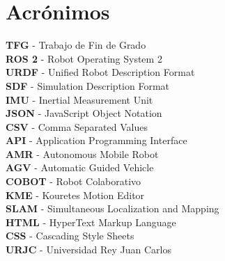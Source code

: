 \chapter*{Acrónimos}

\noindent \textbf{TFG} - Trabajo de Fin de Grado \\
\textbf{ROS 2} - Robot Operating System 2 \\
\textbf{URDF} - Unified Robot Description Format \\
\textbf{SDF} - Simulation Description Format \\
\textbf{IMU} - Inertial Measurement Unit \\
\textbf{JSON} - JavaScript Object Notation \\
\textbf{CSV} - Comma Separated Values \\
\textbf{API} - Application Programming Interface \\
\textbf{AMR} - Autonomous Mobile Robot\\
\textbf{AGV} - Automatic Guided Vehicle\\
\textbf{COBOT} - Robot Colaborativo \\
\textbf{KME} -  Kouretes Motion Editor \\
\textbf{SLAM} -  Simultaneous Localization and Mapping \\
\textbf{HTML} -  HyperText Markup Language \\
\textbf{CSS} -   Cascading Style Sheets \\
\textbf{URJC} -   Universidad Rey Juan Carlos \\

